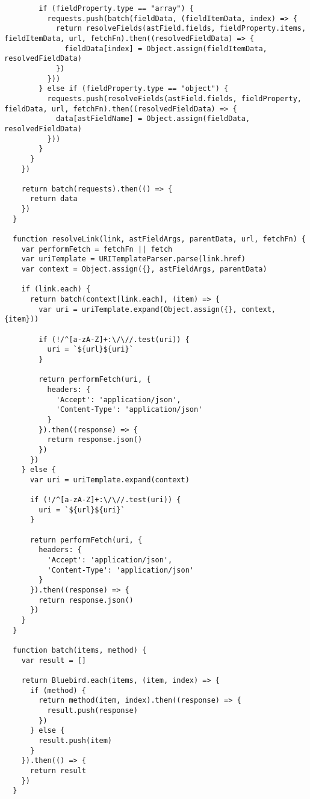 \begin{verbatim}
        if (fieldProperty.type == "array") {
          requests.push(batch(fieldData, (fieldItemData, index) => {
            return resolveFields(astField.fields, fieldProperty.items, fieldItemData, url, fetchFn).then((resolvedFieldData) => {
              fieldData[index] = Object.assign(fieldItemData, resolvedFieldData)
            })
          }))
        } else if (fieldProperty.type == "object") {
          requests.push(resolveFields(astField.fields, fieldProperty, fieldData, url, fetchFn).then((resolvedFieldData) => {
            data[astFieldName] = Object.assign(fieldData, resolvedFieldData)
          }))
        }
      }
    })

    return batch(requests).then(() => {
      return data
    })
  }

  function resolveLink(link, astFieldArgs, parentData, url, fetchFn) {
    var performFetch = fetchFn || fetch
    var uriTemplate = URITemplateParser.parse(link.href)
    var context = Object.assign({}, astFieldArgs, parentData)

    if (link.each) {
      return batch(context[link.each], (item) => {
        var uri = uriTemplate.expand(Object.assign({}, context, {item}))

        if (!/^[a-zA-Z]+:\/\//.test(uri)) {
          uri = `${url}${uri}`
        }

        return performFetch(uri, {
          headers: {
            'Accept': 'application/json',
            'Content-Type': 'application/json'
          }
        }).then((response) => {
          return response.json()
        })
      })
    } else {
      var uri = uriTemplate.expand(context)

      if (!/^[a-zA-Z]+:\/\//.test(uri)) {
        uri = `${url}${uri}`
      }

      return performFetch(uri, {
        headers: {
          'Accept': 'application/json',
          'Content-Type': 'application/json'
        }
      }).then((response) => {
        return response.json()
      })
    }
  }

  function batch(items, method) {
    var result = []

    return Bluebird.each(items, (item, index) => {
      if (method) {
        return method(item, index).then((response) => {
          result.push(response)
        })
      } else {
        result.push(item)
      }
    }).then(() => {
      return result
    })
  }
\end{verbatim}
